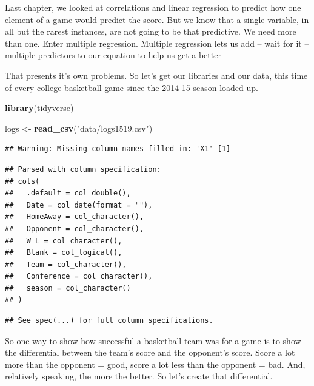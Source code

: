 \documentclass[
]{book}
\newenvironment{Shaded}{\begin{snugshade}}{\end{snugshade}}
\newcommand{\KeywordTok}[1]{\textcolor[rgb]{0.13,0.29,0.53}{\textbf{#1}}}
\newcommand{\NormalTok}[1]{#1}
\newcommand{\StringTok}[1]{\textcolor[rgb]{0.31,0.60,0.02}{#1}}
\begin{document}
Last chapter, we looked at correlations and linear regression to predict how one element of a game would predict the score. But we know that a single variable, in all but the rarest instances, are not going to be that predictive. We need more than one. Enter multiple regression. Multiple regression lets us add -- wait for it -- multiple predictors to our equation to help us get a better

That presents it's own problems. So let's get our libraries and our data, this time of \href{https://unl.box.com/s/u9407jj007fxtnu1vbkybdawaqg6j3fw}{every college basketball game since the 2014-15 season} loaded up.

\begin{Shaded}
\begin{Highlighting}[]
\KeywordTok{library}\NormalTok{(tidyverse)}
\end{Highlighting}
\end{Shaded}

\begin{Shaded}
\begin{Highlighting}[]
\NormalTok{logs <-}\StringTok{ }\KeywordTok{read_csv}\NormalTok{(}\StringTok{"data/logs1519.csv"}\NormalTok{)}
\end{Highlighting}
\end{Shaded}

\begin{verbatim}
## Warning: Missing column names filled in: 'X1' [1]
\end{verbatim}

\begin{verbatim}
## Parsed with column specification:
## cols(
##   .default = col_double(),
##   Date = col_date(format = ""),
##   HomeAway = col_character(),
##   Opponent = col_character(),
##   W_L = col_character(),
##   Blank = col_logical(),
##   Team = col_character(),
##   Conference = col_character(),
##   season = col_character()
## )
\end{verbatim}

\begin{verbatim}
## See spec(...) for full column specifications.
\end{verbatim}

So one way to show how successful a basketball team was for a game is to show the differential between the team's score and the opponent's score. Score a lot more than the opponent = good, score a lot less than the opponent = bad. And, relatively speaking, the more the better. So let's create that differential.
\end{document}

